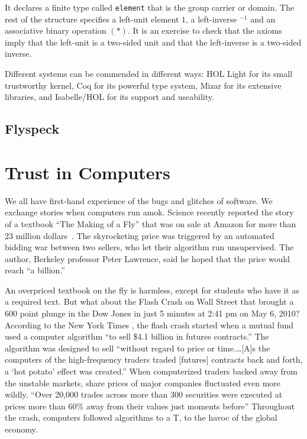 \documentclass{llncs}
\begin{document}
\smallskip

It declares a finite type called {\tt element} that is the group carrier or domain.
The rest of the structure specifies a left-unit element $1$, 
a left-inverse ${}^{-1}$ and an associative binary operation $( * )$. 
It is an exercise to check that the axioms imply that the left-unit is a two-sided
unit and that the left-inverse is a two-sided inverse.




\bigskip

Different systems can be commended in different ways: HOL Light for
its small trustworthy kernel, Coq for its powerful type system, Mizar
for its extensive libraries, and Isabelle/HOL for its support and useability.



\subsection{Flyspeck}
\section{Trust in Computers}

We all have first-hand experience of the bugs and glitches of
software.  We exchange stories when computers run amok.  Science
recently reported the story of a textbook ``The Making of a Fly'' that
was on sale at Amazon for more than 23 million dollars~\cite{Sci11}.  The
skyrocketing price was triggered by an automated bidding war between
two sellers, who let their algorithm run unsupervised.  The author,
Berkeley professor Peter Lawrence, said he hoped that the price would
reach ``a billion.''


An overpriced textbook on the fly is harmless, except for students who
have it as a required text.  But what about the Flash Crash on Wall
Street that brought a 600 point plunge in the Dow Jones in just 5
minutes at 2:41 pm on May 6, 2010?  According to the New York Times \cite{NYT2010}, the flash
crash started when a mutual fund used a computer algorithm ``to sell
\$4.1 billion in futures contracts.''  The algorithm was designed to
sell ``without regard to price or time.\dots [A]s the computers of the
high-frequency traders traded [futures] contracts back and forth, a
`hot potato' effect was created.''  When computerized traders backed
away from the unstable markets, share prices of major companies
fluctuated even more wildly. ``Over 20,000 trades across more than 300
securities were executed at prices more than 60\% away from their
values just moments before'' \cite{SEC2010} Throughout the crash,
computers followed algorithms to a T, to the havoc
of the global economy. 
\end{document}
